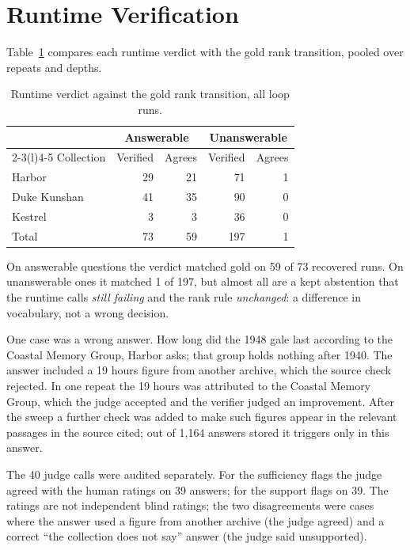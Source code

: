 \documentclass[12pt, a4paper, oneside]{report}
\newcommand{\code}[1]{\texttt{\detokenize{#1}}}
\begin{document}
\section{Runtime Verification}
\label{sec:verify}

Table~\ref{tbl:verify} compares each runtime verdict with the gold rank
transition, pooled over repeats and depths.

\begin{table}[htbp]
\centering
\footnotesize
\begin{tabular}{@{}lrrrr@{}}
\toprule
 & \multicolumn{2}{c}{Answerable} & \multicolumn{2}{c}{Unanswerable} \\
\cmidrule(lr){2-3}\cmidrule(l){4-5}
Collection & Verified & Agrees & Verified & Agrees \\
\midrule
Harbor & 29 & 21 & 71 & 1 \\
Duke Kunshan & 41 & 35 & 90 & 0 \\
Kestrel & 3 & 3 & 36 & 0 \\
\midrule
Total & 73 & 59 & 197 & 1 \\
\bottomrule
\end{tabular}
\caption{Runtime verdict against the gold rank transition, all loop runs.}
\label{tbl:verify}
\end{table}

On answerable questions the verdict matched gold on 59 of 73 recovered
runs. On unanswerable ones it matched 1 of 197, but almost all are a kept
abstention that the runtime calls \emph{still failing} and the rank rule
\emph{unchanged}: a difference in vocabulary, not a wrong decision.

One case was a wrong answer. How long did the 1948 gale last according
to the Coastal Memory Group, Harbor \code{gold-029} asks; that group holds
nothing after 1940. The answer included a 19 hours
figure from another archive, which the source check rejected. In one repeat
the 19 hours was attributed to the Coastal Memory Group, which the judge
accepted and the verifier judged an improvement. After the sweep a further
check was added to make such figures appear in the relevant passages in the
source cited; out of 1{,}164 answers stored it triggers only in this answer.

The 40 judge calls were audited separately. For the sufficiency flags the
judge agreed with the human ratings on 39 answers; for the support flags on
39. The ratings are not independent blind ratings; the two disagreements were cases
where the answer used a figure from another archive (the judge agreed) and
a correct ``the collection does not say'' answer (the judge said
unsupported).
\end{document}
